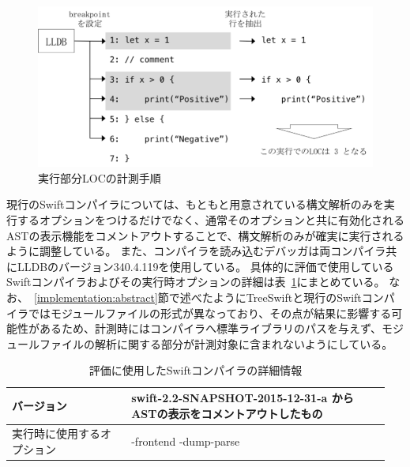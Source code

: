 \begin{figure}
    \begin{center}
        \includegraphics[scale=0.8]{./img/loc_measurement.png}
        \caption{実行部分LOCの計測手順}
        \label{img:loc-measurement}
    \end{center}
\end{figure}

現行のSwiftコンパイラについては、もともと用意されている構文解析のみを実行するオプションをつけるだけでなく、通常そのオプションと共に有効化されるASTの表示機能をコメントアウトすることで、構文解析のみが確実に実行されるように調整している。
また、コンパイラを読み込むデバッガは両コンパイラ共にLLDBのバージョン340.4.119を使用している。
具体的に評価で使用しているSwiftコンパイラおよびその実行時オプションの詳細は表~\ref{table:swift-exe-option}にまとめている。
なお、~\ref{implementation:abstract}節で述べたようにTreeSwiftと現行のSwiftコンパイラではモジュールファイルの形式が異なっており、その点が結果に影響する可能性があるため、計測時にはコンパイラへ標準ライブラリのパスを与えず、モジュールファイルの解析に関する部分が計測対象に含まれないようにしている。

\begin{table}[!hbtp]
    \begin{center}
        \caption{評価に使用したSwiftコンパイラの詳細情報}
        \begin{tabular}{|p{0.3\linewidth}|p{0.65\linewidth}|}
            \hline
            バージョン & swift-2.2-SNAPSHOT-2015-12-31-a からASTの表示をコメントアウトしたもの\\
            \hline
            実行時に使用するオプション & -frontend -dump-parse\\
            \hline
        \end{tabular}
        \label{table:swift-exe-option}
    \end{center}
\end{table}

